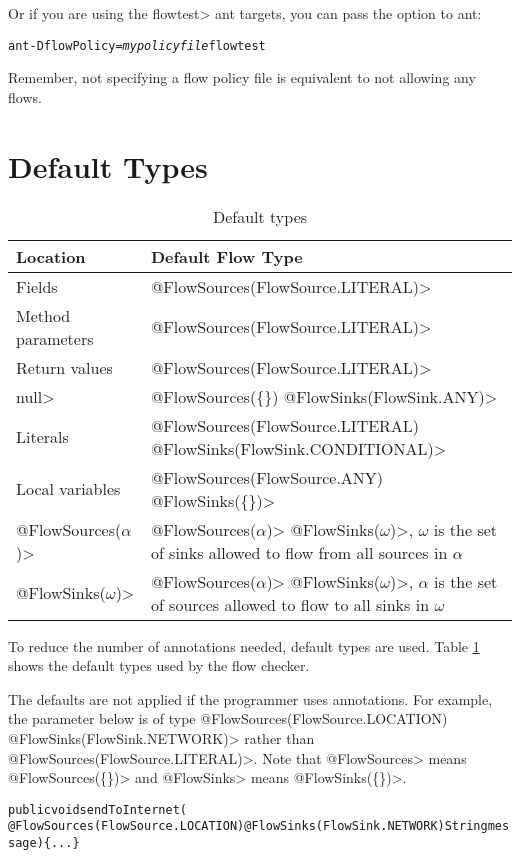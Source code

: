 Or if you are using the \<flowtest> ant targets, you can pass the option to ant:
\begin{alltt}
ant -DflowPolicy=\emph{mypolicyfile} flowtest
\end{alltt}

Remember, not specifying a flow policy file is equivalent to not
allowing any flows.






\section{Default Types\label{flow-defaults}}

\begin{table}[h]
    \begin{tabular}{ll}
    \toprule
\bf{Location}&\bf{Default Flow Type}\\
\midrule 
    Fields &  \<@FlowSources(FlowSource.LITERAL)> \\ 
    Method parameters &  \<@FlowSources(FlowSource.LITERAL)> \\ 
    Return values &  \<@FlowSources(FlowSource.LITERAL)> \\ 
    \<null> &  \<@FlowSources(\{\}) @FlowSinks(FlowSink.ANY)>\\ 
    Literals & \<@FlowSources(FlowSource.LITERAL) @FlowSinks(FlowSink.CONDITIONAL)>\\ 
   Local variables  &   \<@FlowSources(FlowSource.ANY) @FlowSinks(\{\})> \\ 
   \<@FlowSources($\alpha$)>&\<@FlowSources($\alpha$)>
   \<@FlowSinks($\omega$)>,  $\omega$ is the set of  sinks allowed to flow from all sources in $\alpha$ \\ 
      \<@FlowSinks($\omega$)>&\<@FlowSources($\alpha$)>
      \<@FlowSinks($\omega$)>, $\alpha$ is the set of  sources allowed to flow to all sinks in $\omega$ \\ 
      
      \bottomrule
    \end{tabular}
    \caption{Default types}\label{table:defaults}
\end{table}


To reduce the number of annotations needed, default types are
used. Table \ref{table:defaults} shows the default types used by the
flow checker.


The defaults are not applied if the programmer uses annotations.  For
example, the parameter below is of type
\<@FlowSources(FlowSource.LOCATION) @FlowSinks(FlowSink.NETWORK)>
rather than  \<@FlowSources({FlowSource.LITERAL})>. Note that \<@FlowSources>
means \<@FlowSources(\{\})> and \<@FlowSinks>  means \<@FlowSinks(\{\})>.
\begin{alltt}
public void sendToInternet(
    @FlowSources(FlowSource.LOCATION) @FlowSinks(FlowSink.NETWORK) String message)\{...\}
\end{alltt} 

